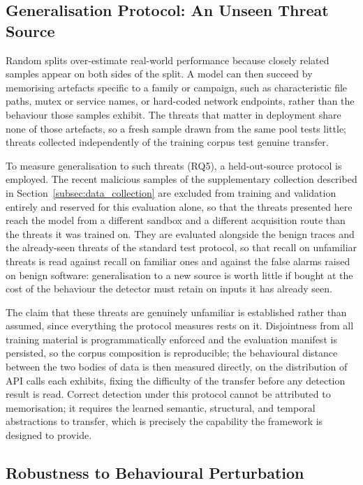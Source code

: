 \documentclass[%
    BCOR=10mm,
    DIV=13,
    toc=bibliography,
    toc=listof,
    oneside,
    12pt,
]{scrbook}
\begin{document}
\subsection{Generalisation Protocol: An Unseen Threat Source}
\label{subsec:lofo}

Random splits over-estimate real-world performance because closely related
samples appear on both sides of the split. A model can then succeed by
memorising artefacts specific to a family or campaign, such as characteristic
file paths, mutex or service names, or hard-coded network endpoints, rather than
the behaviour those samples exhibit. The threats that matter in deployment share
none of those artefacts, so a fresh sample drawn from the same pool tests
little; threats collected independently of the training corpus test genuine
transfer.

To measure generalisation to such threats (RQ5), a held-out-source protocol is
employed. The recent malicious samples of the supplementary collection described
in Section~\ref{subsec:data_collection} are excluded from training and
validation entirely and reserved for this evaluation alone, so that the threats
presented here reach the model from a different sandbox and a different
acquisition route than the threats it was trained on. They are evaluated
alongside the benign traces and the already-seen threats of the standard test
protocol, so that
recall on unfamiliar threats is read against recall on familiar ones and against
the false alarms raised on benign software: generalisation to a new source is
worth little if bought at the cost of the behaviour the detector must retain on
inputs it has already seen.

The claim that these threats are genuinely unfamiliar is established rather than
assumed, since everything the protocol measures rests on it. Disjointness from
all training material is programmatically enforced and the evaluation manifest
is persisted, so the corpus composition is reproducible; the behavioural
distance between the two bodies of data is then measured directly, on the
distribution of API calls each exhibits, fixing the difficulty of the transfer
before any detection result is read. Correct detection under this protocol
cannot be attributed to memorisation; it requires the learned semantic,
structural, and temporal abstractions to transfer, which is precisely the
capability the framework is designed to provide.

\subsection{Robustness to Behavioural Perturbation}
\label{subsec:robustness_eval}
\end{document}
